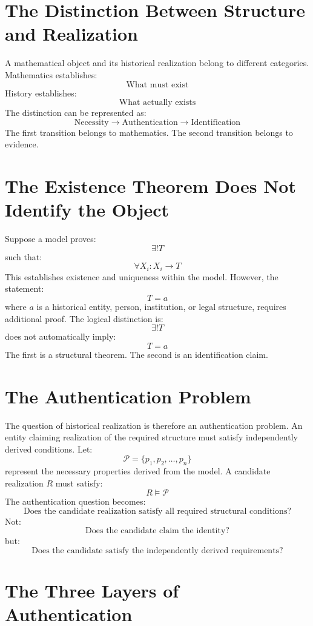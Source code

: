 \documentclass[11pt,openany]{book}
\theoremstyle{plain}
\theoremstyle{definition}
\begin{document}
\section{The Distinction Between Structure and Realization}

A mathematical object and its historical realization belong to different categories. Mathematics establishes:
\[
\text{What must exist}
\]
History establishes:
\[
\text{What actually exists}
\]
The distinction can be represented as:
\[
\text{Necessity} \longrightarrow \text{Authentication} \longrightarrow \text{Identification}
\]
The first transition belongs to mathematics. The second transition belongs to evidence.

\section{The Existence Theorem Does Not Identify the Object}

Suppose a model proves:
\[
\exists ! T
\]
such that:
\[
\forall X_i: X_i \to T
\]
This establishes existence and uniqueness within the model. However, the statement:
\[
T = a
\]
where \(a\) is a historical entity, person, institution, or legal structure, requires additional proof. The logical distinction is:
\[
\exists ! T
\]
does not automatically imply:
\[
T = a
\]
The first is a structural theorem. The second is an identification claim.

\section{The Authentication Problem}

The question of historical realization is therefore an authentication problem. An entity claiming realization of the required structure must satisfy independently derived conditions. Let:
\[
\mathcal{P} = \{p_1, p_2, \ldots, p_n\}
\]
represent the necessary properties derived from the model. A candidate realization \(R\) must satisfy:
\[
R \models \mathcal{P}
\]
The authentication question becomes:
\[
\boxed{
\text{Does the candidate realization satisfy all required structural conditions?}
}
\]
Not:
\[
\text{Does the candidate claim the identity?}
\]
but:
\[
\text{Does the candidate satisfy the independently derived requirements?}
\]

\section{The Three Layers of Authentication}
\end{document}
